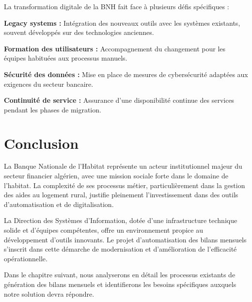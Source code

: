 La transformation digitale de la BNH fait face à plusieurs défis spécifiques :

\medskip

\textbf{Legacy systems :} Intégration des nouveaux outils avec les systèmes existants, souvent développés sur des technologies anciennes.

\textbf{Formation des utilisateurs :} Accompagnement du changement pour les équipes habituées aux processus manuels.

\textbf{Sécurité des données :} Mise en place de mesures de cybersécurité adaptées aux exigences du secteur bancaire.

\textbf{Continuité de service :} Assurance d'une disponibilité continue des services pendant les phases de migration.

\section{Conclusion}

La Banque Nationale de l'Habitat représente un acteur institutionnel majeur du secteur financier algérien, avec une mission sociale forte dans le domaine de l'habitat. La complexité de ses processus métier, particulièrement dans la gestion des aides au logement rural, justifie pleinement l'investissement dans des outils d'automatisation et de digitalisation.

\medskip

La Direction des Systèmes d'Information, dotée d'une infrastructure technique solide et d'équipes compétentes, offre un environnement propice au développement d'outils innovants. Le projet d'automatisation des bilans mensuels s'inscrit dans cette démarche de modernisation et d'amélioration de l'efficacité opérationnelle.

\medskip

Dans le chapitre suivant, nous analyserons en détail les processus existants de génération des bilans mensuels et identifierons les besoins spécifiques auxquels notre solution devra répondre.